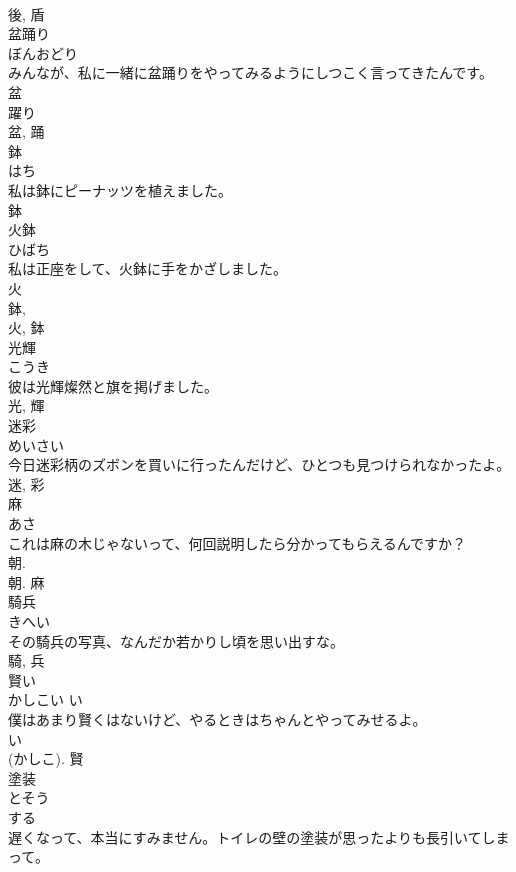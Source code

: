 \documentclass[8pt]{extreport}
\begin{document}
\begin{CJK}{UTF8}{min}
\\	後, 盾	
\\	盆踊り	
\\	ぼんおどり	
\\	みんなが、私に一緒に盆踊りをやってみるようにしつこく言ってきたんです。	
\\	盆 
\\	躍り 
\\	盆, 踊	
\\	鉢	
\\	はち	
\\	私は鉢にピーナッツを植えました。	
\\	鉢	
\\	火鉢	
\\	ひばち	
\\	私は正座をして、火鉢に手をかざしました。	
\\	火 
\\	鉢, 
\\	火, 鉢	
\\	光輝	
\\	こうき	
\\	彼は光輝燦然と旗を掲げました。	
\\	光, 輝	
\\	迷彩	
\\	めいさい	
\\	今日迷彩柄のズボンを買いに行ったんだけど、ひとつも見つけられなかったよ。	
\\	迷, 彩	
\\	麻	
\\	あさ	
\\	これは麻の木じゃないって、何回説明したら分かってもらえるんですか？	
\\	朝. 
\\	朝.	麻	
\\	騎兵	
\\	きへい	
\\	その騎兵の写真、なんだか若かりし頃を思い出すな。	
\\	騎, 兵	
\\	賢い	
\\	かしこい	い 
\\	僕はあまり賢くはないけど、やるときはちゃんとやってみせるよ。	
\\	い 
\\	(かしこ).	賢	
\\	塗装	
\\	とそう	
\\	する 
\\	遅くなって、本当にすみません。トイレの壁の塗装が思ったよりも長引いてしまって。	

\end{CJK}
\end{document}

